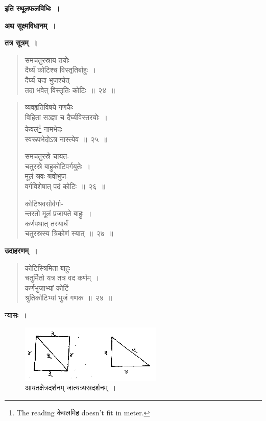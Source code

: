 \documentclass[11pt, openany]{book}
\begin{document}
\begin{center}
   {\large \textbf{इति स्थूलफलविधिः~।}}
\end{center}
 \vspace{4mm}
 
{\large \textbf{अथ सूक्ष्मविधानम्~।}}
\vspace{2mm}

\textbf{तत्र सूत्रम्~।}
 \begin{quote}
     \bs 
      समचतुरस्राय तयोः\\
      दैर्घ्यं कोटिश्च विस्तृतिर्बाहुः~।\\
दैर्घ्यं यदा भुजश्चेत् \\
तदा भवेत् विस्तृतिः कोटिः~॥~२४~॥
 \end{quote}

\newpage%

 \begin{quote}
     \bs 
व्यवहृतिविषये गणकैः\\
विहिता सञ्ज्ञा च दैर्घ्यविस्तरयोः~।\\
केवलं\footnote{The reading केवलमिह doesn't fit in meter.} नामभेदः \\
स्वरूपभेदोऽत्र नास्त्येव~॥~२५~॥ 
\vspace{1mm}

समचतुरस्रे चायत-\\
चतुरस्रे बाहुकोटिवर्गयुतेः~।\\
मूलं श्रवः श्रवोभुज-\\
वर्गविशेषात् पदं कोटिः~॥~२६~॥
\vspace{1mm}

कोटिश्रवसोर्वर्गा-\\
न्तरतो मूलं प्रजायते बाहुः~।\\
कर्णपथात् तस्यार्धं \\
चतुरस्रस्य त्रिकोणं स्यात्~॥~२७~॥
 \end{quote}

 \textbf{उदाहरणम्~।} 
\begin{quote}
    \bqt 
कोटिस्त्रिमिता बाहुः\\
चतुर्मितो यत्र तत्र वद कर्णम्~।\\
कर्णभुजाभ्यां कोटिं \\
श्रुतिकोटिभ्यां भुजं गणक~॥~२४~॥
\end{quote}
\newpage
 \setcounter{footnote}{0}
 न्यासः~। 
\vspace{-2mm}

\begin{figure}[h!]
    \centering
    \includegraphics[scale=0.8]{graphics/capture29.png}
     \captionsetup{labelformat=empty}
\vspace{-2mm}
\caption{आयतक्षेत्रदर्शनम्\hspace{2cm} जात्यत्र्यस्रदर्शनम्~।\hspace{-0.8cm} }
\end{figure}
\end{document}
